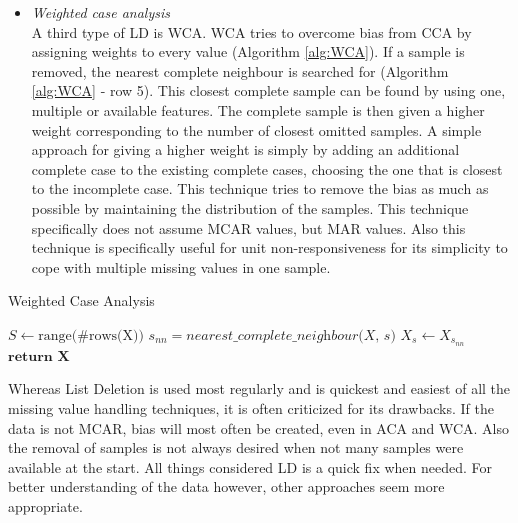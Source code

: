 \documentclass[10pt,a4paper]{report}
\begin{document}
\begin{itemize}
		\item \textit{Weighted case analysis} \\
		A third type of LD is WCA. WCA tries to overcome bias from CCA by assigning 
		weights to every value (Algorithm \ref{alg:WCA}). If a sample is removed, 
		the nearest complete neighbour is searched for (Algorithm \ref{alg:WCA} -  
		row 5). This closest complete sample can be found by using one, multiple or 
		available features. The complete sample is then given a higher weight 
		corresponding to the number of closest omitted samples. A simple approach 
		for giving a higher weight is simply by adding an additional complete case 
		to the existing complete cases, choosing the one that is closest to the 
		incomplete case. This technique tries to remove the bias as much as 
		possible by maintaining the distribution of the samples. This technique 
		specifically does not assume MCAR values, but MAR 
		values\cite{haukoos2007advanced, donders2006gentle}. Also this 
		technique is specifically useful for unit non-responsiveness for its 
		simplicity to cope with multiple missing values in one 
		sample\cite{patrician2002multiple}.
	\end{itemize}
	
	\begin{algorithm}[H]
		\caption{Weighted Case Analysis}\label{alg:WCA}
		\begin{algorithmic}[1]
			\State $S \gets \text{range(\#rows(X))}$ 	
			 					
			 				 			
			\State $s_{nn} = \textit{nearest\_complete\_neighbour(X, s)}$	
			\State $ X_s \gets X_{s_{nn}}$ 				
			\EndIf
			\EndFor
			\State $\textbf{return X}$
			\EndProcedure
		\end{algorithmic}
	\end{algorithm}	
	
	Whereas List Deletion is used most regularly and is quickest and easiest of all the missing value handling techniques, it is often criticized for its drawbacks. If the data is not MCAR, bias will most often be created, even in ACA and WCA\cite{cartwright2003dealing}. Also the removal of samples is not always desired when not many samples were available at the start\cite{haukoos2007advanced, myrtveit2001analyzing, donders2006gentle}. All things considered LD is a quick fix when needed. For better understanding of the data however, other approaches seem more appropriate.
	
\end{document}
